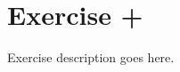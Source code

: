 \section{Exercise +}
\begin{question}
   Exercise description goes here. 
\end{question}

\begin{solution}
\end{solution}
